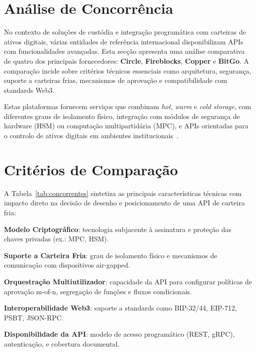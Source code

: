 \newpage
\section{Análise de Concorrência}
No contexto de soluções de custódia e integração programática com carteiras de ativos digitais, várias entidades de referência internacional disponibilizam APIs com funcionalidades avançadas. Esta secção apresenta uma análise comparativa de quatro dos principais fornecedores: \textbf{Circle}, \textbf{Fireblocks}, \textbf{Copper} e \textbf{BitGo}. A comparação incide sobre critérios técnicos essenciais como arquitetura, segurança, suporte a carteiras frias, mecanismos de aprovação e compatibilidade com standards Web3.

Estas plataformas fornecem serviços que combinam \textit{hot}, \textit{warm} e \textit{cold storage}, com diferentes graus de isolamento físico, integração com módulos de segurança de hardware (HSM) ou computação multipartidária (MPC), e APIs orientadas para o controlo de ativos digitais em ambientes institucionais~\cite{fireblocks2023,circle2023,copper2023,bitgo2023}.

\section{Critérios de Comparação}
A Tabela~\ref{tab:concorrentes} sintetiza as principais características técnicas com impacto direto na decisão de desenho e posicionamento de uma API de carteira fria:

\textbf{Modelo Criptográfico}: tecnologia subjacente à assinatura e proteção das chaves privadas (ex.: MPC, HSM).

\textbf{Suporte a Carteira Fria}: grau de isolamento físico e mecanismos de comunicação com dispositivos air-gapped.

\textbf{Orquestração Multiutilizador}: capacidade da API para configurar políticas de aprovação m-of-n, segregação de funções e fluxos condicionais.

\textbf{Interoperabilidade Web3}: suporte a standards como BIP-32/44, EIP-712, PSBT, JSON-RPC.

\textbf{Disponibilidade da API}: modelo de acesso programático (REST, gRPC), autenticação, e cobertura documental.

